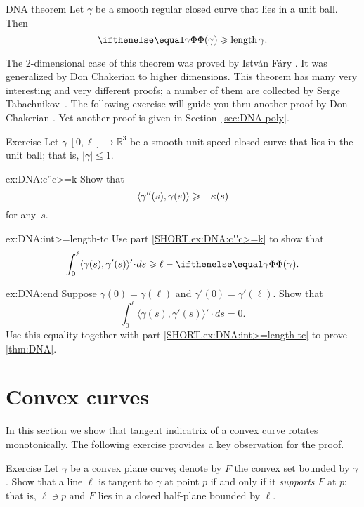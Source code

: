 \begin{thm}{DNA theorem}\label{thm:DNA}
Let $\gamma$ be a smooth regular closed curve that lies in a unit ball.
Then 
\[\tc\gamma\ge \length\gamma.\]

\end{thm}

The 2-dimensional case of this theorem was proved by Istv\'{a}n F\'{a}ry \cite{fary1950}.
It was generalized by Don Chakerian \cite{chakerian1962} to higher dimensions.
This theorem has many very interesting and very different proofs;
a number of them are collected by Serge Tabachnikov~\cite{tabachnikov}.
The following exercise will guide you thru another proof by Don Chakerian \cite{chakerian1964}.
Yet another proof is given in Section~\ref{sec:DNA-poly}.

\begin{thm}{Exercise}\label{ex:DNA}
Let $\gamma\:[0,\ell]\to\mathbb{R}^3$ be a smooth unit-speed closed curve that lies in the unit ball; that is, $|\gamma|\le 1$.

\begin{subthm}{ex:DNA:c''c>=k}
Show that 
\[\langle\gamma''(s),\gamma(s)\rangle\geqslant-\kappa(s)\]
for any~$s$.
\end{subthm}

\begin{subthm}{ex:DNA:int>=length-tc}
Use part \ref{SHORT.ex:DNA:c''c>=k} to show that 
\[\int_0^\ell\langle\gamma(s),\gamma'(s)\rangle'\cdot ds\ge
\ell-\tc\gamma.\]

\end{subthm}

\begin{subthm}{ex:DNA:end}
Suppose $\gamma(0)=\gamma(\ell)$ and $\gamma'(0)=\gamma'(\ell)$.
Show that 
\[\int_0^\ell\langle\gamma(s),\gamma'(s)\rangle'\cdot ds=0.\]
Use this equality together with  part \ref{SHORT.ex:DNA:int>=length-tc} to prove \ref{thm:DNA}.
\end{subthm}
\end{thm}

\section{Convex curves}

In this section we show that tangent indicatrix of a convex curve rotates monotonically. 
The following exercise provides a key observation for the proof.

\begin{thm}{Exercise}\label{ex:tangent-support}
Let $\gamma$ be a convex plane curve;
denote by $F$ the convex set bounded by $\gamma$.
Show that a line $\ell$ is tangent to $\gamma$ at point $p$ if and only if it \emph{supports} $F$ at $p$;
that is, $\ell\ni p$ and $F$ lies in a closed half-plane bounded by $\ell$.
\end{thm}

